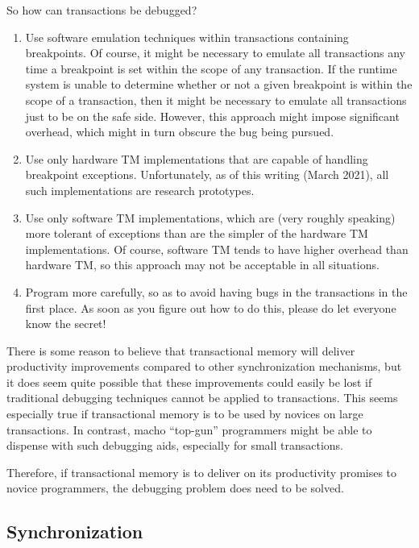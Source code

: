 So how can transactions be debugged?

\begin{enumerate}
\item	Use software emulation techniques within transactions containing
	breakpoints.
	Of course, it might be necessary to emulate all transactions
	any time a breakpoint is set within the scope of any transaction.
	If the runtime system is unable to determine whether or not a
	given breakpoint is within the scope of a transaction, then it
	might be necessary to emulate all transactions just to be on
	the safe side.
	However, this approach might impose significant overhead, which
	might in turn obscure the bug being pursued.
\item	Use only hardware TM implementations that are capable of
	handling breakpoint exceptions.
	Unfortunately, as of this writing (March 2021), all such
	implementations are research prototypes.
\item	Use only software TM implementations, which are
	(very roughly speaking) more tolerant of exceptions than are
	the simpler of the hardware TM implementations.
	Of course, software TM tends to have higher overhead than hardware
	TM, so this approach may not be acceptable in all situations.
\item	Program more carefully, so as to avoid having bugs in the
	transactions in the first place.
	As soon as you figure out how to do this, please do let everyone
	know the secret!
\end{enumerate}

There is some reason to believe that transactional memory will deliver
productivity improvements compared to other synchronization mechanisms,
but it does seem quite possible that these improvements could easily
be lost if traditional debugging techniques cannot be applied to
transactions.
This seems especially true if transactional memory is to be used by
novices on large transactions.
In contrast, macho ``top-gun'' programmers might be able to dispense with
such debugging aids, especially for small transactions.

Therefore, if transactional memory is to deliver on its productivity
promises to novice programmers, the debugging problem does need to
be solved.

\subsection{Synchronization}
\label{sec:future:Synchronization}

